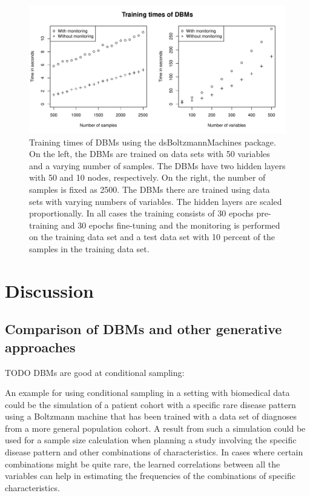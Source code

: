 \documentclass[12pt]{article}
\begin{document}
\begin{figure}[h]
   \centering
   \includegraphics[scale=.6]{images/trainingtimes.pdf}
   \caption{Training times of DBMs using the dsBoltzmannMachines package. On the left, the DBMs are trained on data sets with 50 variables and a varying number of samples. The DBMs have two hidden layers with 50 and 10 nodes, respectively. On the right, the number of samples is fixed as 2500. The DBMs there are trained using data sets with varying numbers of variables. The hidden layers are scaled proportionally. In all cases the training consists of 30 epochs pre-training and 30 epochs fine-tuning and the monitoring is performed on the training data set and a test data set with 10 percent of the samples in the training data set.}
   \label{fig:dbmtrainingtimes}
 \end{figure}
 
\clearpage
\FloatBarrier

\section{Discussion}

\subsection{Comparison of DBMs and other generative approaches}

TODO DBMs are good at conditional sampling:

An example for using conditional sampling in a setting with biomedical data could be the simulation of a patient cohort with a specific rare disease pattern using a Boltzmann machine that has been trained with a data set of diagnoses from a more general population cohort.
A result from such a simulation could be used for a sample size calculation when planning a study involving the specific disease pattern and other combinations of characteristics.
In cases where certain combinations might be quite rare, the learned correlations between all the variables can help in estimating the frequencies of the combinations of specific characteristics.
\end{document}
